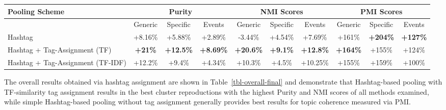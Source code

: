 \documentclass{sig-alternate}
\newcommand{\secmoveup}{\vspace{-1.mm}}
\begin{document}
\begin{table*}[t!]
\vspace{-4mm}
\caption{ Overall percentage improvement of Hashtag-based pooling variants over Unpooled scheme.}\label{tbl-overall-final}
\centering
\resizebox{17.5cm}{!} 
{
        \begin{tabular}{|l|ccc|ccc|ccc|}
        \hline
        Pooling Scheme  & \multicolumn {3}{c}{Purity} & \multicolumn {3}{c}{NMI Scores} & \multicolumn {3}{c|}{PMI Scores}\\
        \hline
         & Generic & Specific & Events &  Generic & Specific & Events &  Generic & Specific & Events\\
        \hline
        Hashtag & +8.16\% & +5.88\% & +2.89\% & -3.44\% & +4.54\% & +7.69\% & +161\% & \textbf{+204\%} & \textbf{+127\%} \\
        \hline
        Hashtag + Tag-Assignment (TF) & \textbf{+21\%} & \textbf{+12.5\%} & \textbf{+8.69\%} & \textbf{+20.6\%} & \textbf{+9.1\%} & \textbf{+12.8\%} & \textbf{+164\%} & +155\% & +124\% \\
        \hline
        Hashtag + Tag-Assignment (TF-IDF) & +12.2\% & +9.4\% & +4.34\% & +10.3\% & +4.5\% & +10.25\% & +155\% & +159\% & +100\% \\
        \hline
        \end{tabular}
}
\end{table*}

The overall results obtained via hashtag assignment are shown in
Table~\ref{tbl-overall-final} and demonstrate that Hashtag-based pooling
with TF-similarity tag assignment results in the best cluster
reproductions with the highest Purity and NMI scores of all methods
examined, while simple Hashtag-based pooling without tag assignment generally
provides best results for topic coherence measured via PMI.

\secmoveup
\end{document}
